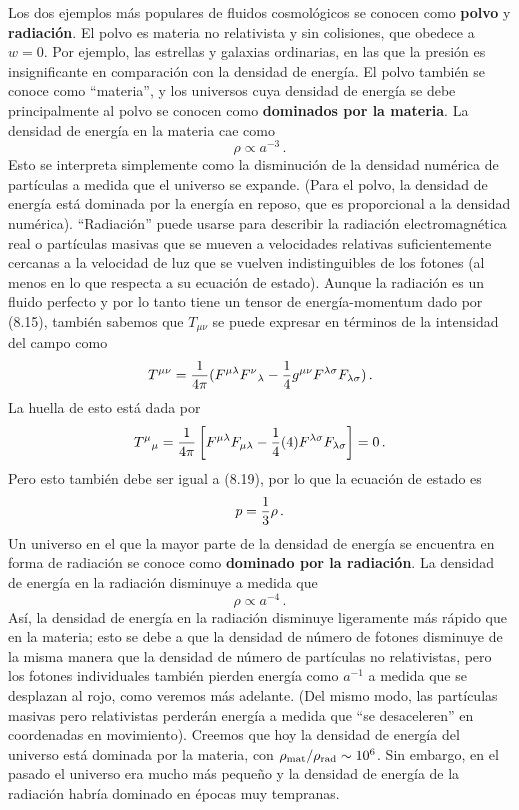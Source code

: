\documentclass[11pt,b5paper,openany,twoside]{book}
\newcommand{\mn}{{\mu\nu}}
\begin{document}
Los dos ejemplos más populares de fluidos cosmológicos se conocen como {\bf polvo} y {\bf radiación}.
El polvo es materia no relativista y sin colisiones, que obedece a $w=0$.
Por ejemplo, las estrellas y galaxias ordinarias, en las que la presión es insignificante en comparación con la densidad de energía.
El polvo también se conoce como ``materia'', y los universos cuya densidad de energía se debe principalmente al polvo se conocen como {\bf dominados por la materia}.
La densidad de energía en la materia cae como
\begin{equation}
\rho\propto a^{-3}\,.\label{8.24}
\end{equation}
Esto se interpreta simplemente como la disminución de la densidad numérica de partículas a medida que el universo se expande.
(Para el polvo, la densidad de energía está dominada por la energía en reposo, que es proporcional a la densidad numérica). ``Radiación'' puede usarse para describir la radiación electromagnética real o partículas masivas que se mueven a velocidades relativas suficientemente cercanas a la velocidad de luz que se vuelven indistinguibles de los fotones (al menos en lo que respecta a su ecuación de estado).
Aunque la radiación es un fluido perfecto y por lo tanto tiene un tensor de energía-momentum dado por (8.15), también sabemos que $T_\mn$ se puede expresar en términos de la intensidad del campo como
\begin{equation}
T^\mn = {1\over{4\pi}}(F^{\mu\lambda}F^\nu{}_\lambda
-{1\over 4}g^{\mu\nu} F^{\lambda\sigma}F_{\lambda\sigma})\,.
\label{8.25}
\end{equation}
La huella de esto está dada por
\begin{equation}
T^\mu{}_\mu = {1\over{4\pi}}\left[F^{\mu\lambda}F_{\mu\lambda}
-{1\over 4}(4)F^{\lambda\sigma}F_{\lambda\sigma}\right] = 0\,.\label{8.26}
\end{equation}
Pero esto también debe ser igual a (8.19), por lo que la ecuación de estado es
\begin{equation}
p = {1\over 3}\rho\,.\label{8.27}
\end{equation}
Un universo en el que la mayor parte de la densidad de energía se encuentra en forma de radiación se conoce como {\bf dominado por la radiación}.
La densidad de energía en la radiación disminuye a medida que
\begin{equation}
\rho \propto a^{-4}\,.\label{8.28}
\end{equation}
Así, la densidad de energía en la radiación disminuye ligeramente más rápido que en la materia; esto se debe a que la densidad de número de fotones disminuye de la misma manera que la densidad de número de partículas no relativistas, pero los fotones individuales también pierden energía como $a^{-1}$ a medida que se desplazan al rojo, como veremos más adelante.
(Del mismo modo, las partículas masivas pero relativistas perderán energía a medida que ``se desaceleren'' en coordenadas en movimiento).
Creemos que hoy la densidad de energía del universo está dominada por la materia, con $\rho_{\rm mat}/\rho_{\rm rad}\sim10^6$.
Sin embargo, en el pasado el universo era mucho más pequeño y la densidad de energía de la radiación habría dominado en épocas muy tempranas.
\end{document}
